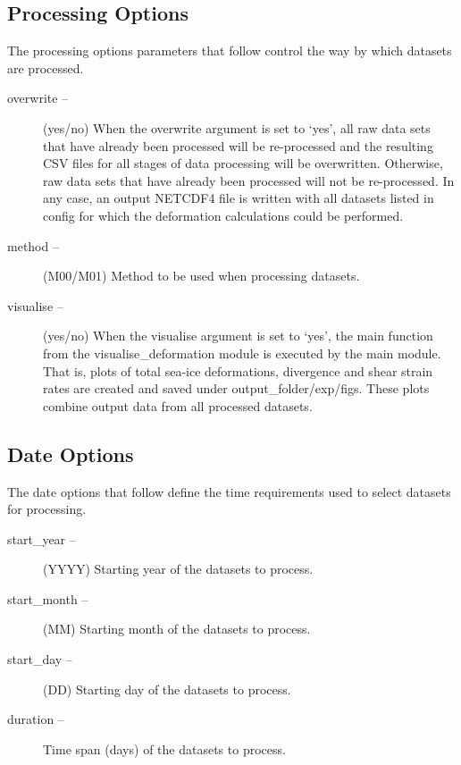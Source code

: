 \documentclass[draft]{agujournal2018}
\begin{document}
\subsection{Processing Options}

The processing options parameters that follow control the way by which datasets are processed.

\begin{description}

\item[overwrite --] (yes/no) When the overwrite argument is set to `yes', all raw data sets that have  already been processed will be re-processed and the resulting CSV files for all stages of data processing will be overwritten. Otherwise, raw data sets that have already been processed will not be re-processed. In any case, an output NETCDF4 file is written with all datasets listed in config for which the deformation calculations could be performed.

\item[method --]  (M00/M01) Method to be used when processing datasets.

\item[visualise --] (yes/no) When the visualise argument is set to `yes', the main function from the visualise\_deformation module is executed by the main module. That is, plots of total sea-ice deformations, divergence and shear strain rates are created and saved under output\_folder/exp/figs. These plots combine output data from all processed datasets.

\end{description}



\subsection{Date Options}

The date options that follow define the time requirements used to select datasets for processing.

\begin{description}
\item[start\_year --]  (YYYY) Starting year of the datasets to process.

\item[start\_month --] (MM) Starting month of the datasets to process.

\item[start\_day --]  (DD) Starting day of the datasets to process.

\item[duration --]   Time span (days) of the datasets to process.
\end{description}
\end{document}
